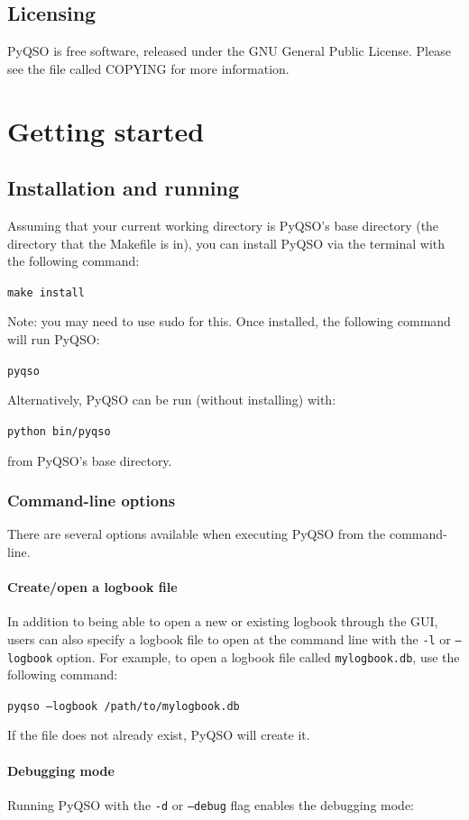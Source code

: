 \documentclass[11pt, a4paper]{report}
\begin{document}
\section{Licensing}
PyQSO is free software, released under the GNU General Public License. Please see the file called COPYING for more information.


\chapter{Getting started}\label{chap:getting_started}

\section{Installation and running}
Assuming that your current working directory is PyQSO's base directory (the directory that the Makefile is in), you can install PyQSO via the terminal with the following command:

  \texttt{make install}

\noindent Note: you may need to use sudo for this. Once installed, the following command will run PyQSO:

  \texttt{pyqso}

\noindent Alternatively, PyQSO can be run (without installing) with:

  \texttt{python bin/pyqso}

\noindent from PyQSO's base directory.

\subsection{Command-line options}
There are several options available when executing PyQSO from the command-line.

\subsubsection{Create/open a logbook file}
In addition to being able to open a new or existing logbook through the GUI, users can also specify a logbook file to open at the command line with the \texttt{-l} or \texttt{--logbook} option. For example, to open a logbook file called \texttt{mylogbook.db}, use the following command:

  \texttt{pyqso --logbook /path/to/mylogbook.db}

If the file does not already exist, PyQSO will create it.

\subsubsection{Debugging mode}
Running PyQSO with the \texttt{-d} or \texttt{--debug} flag enables the debugging mode:
\end{document}
